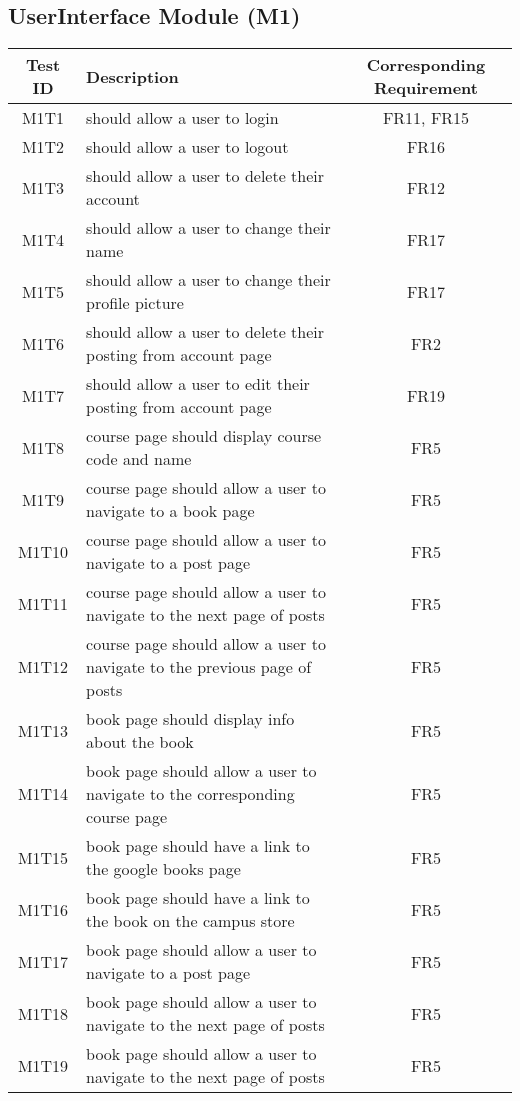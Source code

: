 \documentclass[fullpage]{article}
\begin{document}
\subsection{UserInterface Module (M1)}
\begin{table}[H]
\flushleft
\begin{tabular}{|c|p{8.5cm}|c|}
\hline
 \rowcolor{lightgray}
\textbf{Test ID} &\textbf{Description} &\textbf{Corresponding Requirement}\\
\hline
M1T1 & should allow a user to login & FR11, FR15 \\
\hline
M1T2 & should allow a user to logout & FR16 \\
\hline
M1T3 & should allow a user to delete their account & FR12 \\
\hline
M1T4 & should allow a user to change their name & FR17 \\
\hline
M1T5 & should allow a user to change their profile picture & FR17 \\
\hline
M1T6 & should allow a user to delete their posting from account page & FR2 \\
\hline
M1T7 & should allow a user to edit their posting from account page & FR19 \\
\hline
M1T8 & course page should display course code and name & FR5 \\
\hline
M1T9 & course page should allow a user to navigate to a book page & FR5 \\
\hline
M1T10 & course page should allow a user to navigate to a post page & FR5 \\
\hline
M1T11 & course page should allow a user to navigate to the next page of posts & FR5 \\
\hline
M1T12 & course page should allow a user to navigate to the previous page of posts & FR5 \\
\hline
M1T13 & book page should display info about the book & FR5 \\
\hline
M1T14 & book page should allow a user to navigate to the corresponding course page & FR5 \\
\hline
M1T15 & book page should have a link to the google books page & FR5 \\
\hline
M1T16 & book page should have a link to the book on the campus store & FR5 \\
\hline
M1T17 & book page should allow a user to navigate to a post page & FR5 \\
\hline
M1T18 & book page should allow a user to navigate to the next page of posts & FR5 \\
\hline
M1T19 & book page should allow a user to navigate to the next page of posts & FR5 \\
\hline
\end{tabular}
\end{table}
\end{document}
